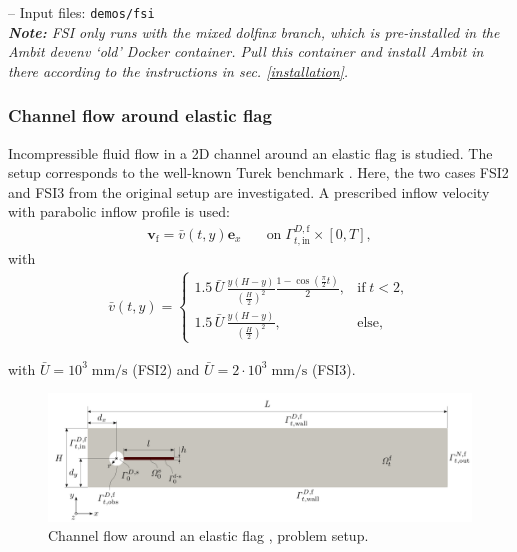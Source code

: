 \documentclass[a4paper,12pt]{report}
\newcommand{\fF}{\text{f}}
\newcommand{\bs}[1]{\boldsymbol{#1}}
\newcommand{\Gm}{\mathit{\Gamma}}
\newcommand{\vf}{\bs{v}_{\fF}} %
\begin{document}
-- Input files: \verb"demos/fsi"\\

\textit{\textbf{Note:} FSI only runs with the mixed dolfinx branch, which is pre-installed in the Ambit devenv `old' Docker container. Pull this container and install Ambit in there according to the instructions in sec. \ref{installation}.}

\subsubsection*{Channel flow around elastic flag}

Incompressible fluid flow in a 2D channel around an elastic flag is studied. The setup corresponds to the well-known Turek benchmark \cite{turek2006}. Here, the two cases FSI2 and FSI3 from the original setup are investigated. A prescribed inflow velocity with parabolic inflow profile is used:\\
\begin{equation}
\begin{aligned}
    \vf = \bar{v}(t,y) \bs{e}_{x}
    \quad &  
    \text{on}\; \Gm_{t,\mathrm{in}}^{D,\fF} \times [0,T],
    \label{eq:flag_dbc_in}
\end{aligned}
\end{equation}
with 
\begin{equation}
\begin{aligned}
    \bar{v}(t,y) = \begin{cases} 1.5 \,\bar{U}\, \frac{y(H-y)}{\left(\frac{H}{2}\right)^2} \frac{1-\cos\left(\frac{\pi}{2}t\right)}{2}, & \text{if} \; t < 2, \\ 1.5 \,\bar{U}\, \frac{y(H-y)}{\left(\frac{H}{2}\right)^2}, & \text{else}, \end{cases}
    \label{eq:flag_dbcs_func}
\end{aligned}
\end{equation}

with $\bar{U}=10^{3}\;\mathrm{mm}/\mathrm{s}$ (FSI2) and $\bar{U}=2\cdot 10^{3}\;\mathrm{mm}/\mathrm{s}$ (FSI3).\\

\begin{figure}
\centering
\includegraphics[width=1.0\textwidth]{fig/channel_flag_setup.png}
\caption{Channel flow around an elastic flag \cite{turek2006}, problem setup.}
\label{fig:channel_flag_setup}
\end{figure}
\end{document}
